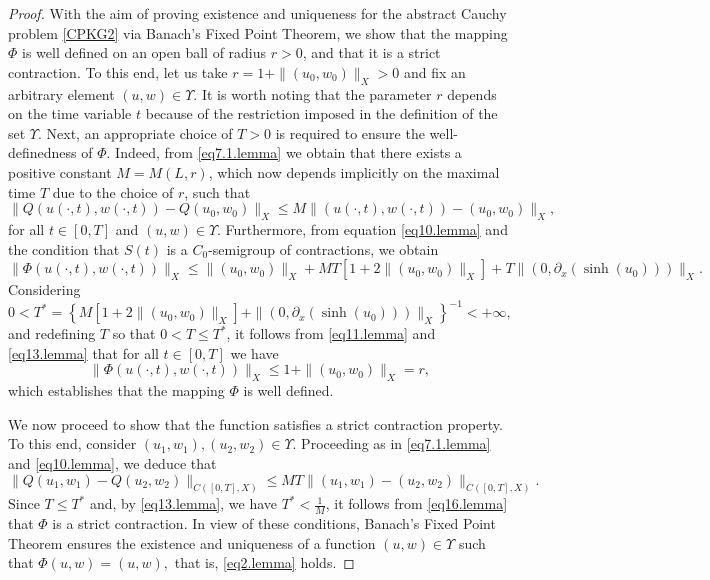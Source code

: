 \documentclass[12pt,reqno,a4paper]{amsart} %
\numberwithin{equation}{section}
\numberwithin{figure}{section}
\begin{document}
\begin{proof}
	With the aim of proving existence and uniqueness for the abstract Cauchy problem \eqref{CPKG2} via Banach’s Fixed Point Theorem, we show that the mapping $\Phi$ is well defined on an open ball of radius $r>0$, and that it is a strict contraction. To this end, let us take $r = 1 + \|(u_0, w_0)\|_X > 0$ and fix an arbitrary element $(u,w) \in \Upsilon$.  
	It is worth noting that the parameter $r$ depends on the time variable $t$ because of the restriction imposed in the definition of the set $\Upsilon$. Next, an appropriate choice of $T>0$ is required to ensure the well-definedness of $\Phi$. Indeed, from \eqref{eq7.1.lemma} we obtain that there exists a positive constant $M=M(L,r)$, which now depends implicitly on the maximal time $T$ due to the choice of $r$, such that
	\begin{equation}\label{eq10.lemma}  
		\|Q(u(\cdot,t), w(\cdot,t))-Q(u_0, w_0)\|_X\leq  M \|(u(\cdot,t),w(\cdot,t))-(u_0, w_0)\|_X,
	\end{equation}for all $t\in [0,T]$ and $(u,w)\in\Upsilon$. Furthermore, from equation \eqref{eq10.lemma} and the condition that $S(t)$ is a $C_0$-semigroup of contractions, we obtain 
	\begin{equation}\label{eq11.lemma}  
		\|\Phi(u(\cdot,t), w(\cdot, t))\|_X\leq \|(u_0,w_0)\|_X+ MT[1+2\|(u_0,w_0)\|_X]  +T\|(0,\partial_x(\sinh(u_0)))\|_X. 
	\end{equation}
	Considering 
	\begin{equation}\label{eq13.lemma}  
		0<T^*=\left\{  M[1+2\|(u_0,w_0)\|_X]+\|(0,\partial_x(\sinh(u_0)))\|_X \right\}^{-1}<+\infty, 
	\end{equation}
	and redefining $T$ so that $0 < T \le T^{*}$, it follows from 
	\eqref{eq11.lemma} and \eqref{eq13.lemma} that for all $t \in [0,T]$ we have
	\begin{equation}\label{eq14.lemma}  
		\|\Phi(u(\cdot,t), w(\cdot, t))\|_X\leq1+\|(u_0,w_0)\|_X=r, 
	\end{equation}which establishes that the mapping $\Phi$ is well defined.
	
	\indent  We now proceed to show that the function satisfies a strict contraction property. To this end, consider $(u_1,w_1), (u_2,w_2)\in \Upsilon$. Proceeding as in \eqref{eq7.1.lemma} and \eqref{eq10.lemma}, 
	we deduce that
	\begin{equation}\label{eq16.lemma}  
		\|Q(u_1, w_1)-Q(u_2, w_2)\|_{C([0,T],X)}\leq  M T\|(u_1,w_1)-(u_2, w_2)\|_{C([0,T],X)}.
	\end{equation} 
	Since $T \le T^{*}$ and, by \eqref{eq13.lemma}, we have $T^{*} < \frac{1}{M}$, it follows from \eqref{eq16.lemma} that $\Phi$ is a strict contraction. In view of these conditions, Banach’s Fixed Point Theorem ensures the existence and uniqueness of a function $(u, w)\in \Upsilon$ such that $\Phi( u, w)=(u, w),$ that is, \eqref{eq2.lemma} holds. 
	

\end{proof}
\end{document}
